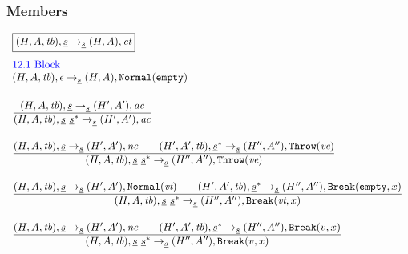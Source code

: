 \documentclass[a4paper, leqno]{amsart}
\newcommand{\rulesep}{\quad\quad}
\newcommand{\stmt}{s}
\newcommand{\ir}[1]{\ensuremath{\underline{#1}}}
\def\inblue{\color{blue}}
\newcommand{\tb}{\emph{tb}}
\newcommand{\vorempty}{\emph{vt}}
\newcommand{\ct}{\emph{ct}}
\newcommand{\ac}{\emph{ac}}
\newcommand{\nc}{\emph{nc}}
\newcommand{\none}{\ensuremath{\epsilon}}
\newcommand{\void}{{\tt Normal}({\tt empty})}
\newcommand{\state}{\ensuremath{(H,A,\tb)}}
\newcommand{\statep}{\ensuremath{(H',A',\tb)}}
\newcommand{\res}{\ensuremath{(H,A)}}
\newcommand{\resp}{\ensuremath{(H',A')}}
\newcommand{\respp}{\ensuremath{(H'',A'')}}
\def\inblue{\color{blue}}
\begin{document}
\subsubsection{Members}



\[
\begin{array}{l@{~~}l@{~~}ll}
\fbox{$\state,\ir{\stmt} \rightarrow_{\ir{\stmt}} \res,\ct$}\\[1em]
\mbox{\inblue 12.1 Block}\\

\state,\none \rightarrow_{\ir{\stmt}} \res,\void\\[1.5em]

\frac{\begin{matrix}
\state,\ir\stmt \rightarrow_{\ir\stmt} \resp,\ac
\end{matrix}}{\begin{matrix}
\state,\ir\stmt\ \ir\stmt^* \rightarrow_{\ir{\stmt}} \resp,\ac
\end{matrix}}\\[2em]

\frac{\begin{matrix}
\state,\ir\stmt \rightarrow_{\ir\stmt} \resp,\nc
\rulesep
\statep,\ir{\stmt}^* \rightarrow_{\ir\stmt} \respp,{\tt Throw}(\emph{ve})
\end{matrix}}{\begin{matrix}
\state,\ir\stmt\ \ir\stmt^* \rightarrow_{\ir{\stmt}} \respp,{\tt Throw}(\emph{ve})
\end{matrix}}\\[2em]

\frac{\begin{matrix}
\state,\ir\stmt \rightarrow_{\ir\stmt} \resp,{\tt Normal}(\vorempty)
\rulesep
\statep,\ir{\stmt}^* \rightarrow_{\ir\stmt} \respp,{\tt Break}({\tt empty},x)
\end{matrix}}{\begin{matrix}
\state,\ir\stmt\ \ir\stmt^* \rightarrow_{\ir{\stmt}} \respp,{\tt Break}(\vorempty,x)
\end{matrix}}\\[2em]

\frac{\begin{matrix}
\state,\ir\stmt \rightarrow_{\ir\stmt} \resp,\nc
\rulesep
\statep,\ir{\stmt}^* \rightarrow_{\ir\stmt} \respp,{\tt Break}(v,x)
\end{matrix}}{\begin{matrix}
\state,\ir\stmt\ \ir\stmt^* \rightarrow_{\ir{\stmt}} \respp,{\tt Break}(v,x)
\end{matrix}}\\[2em]


\end{array}\]
\end{document}
